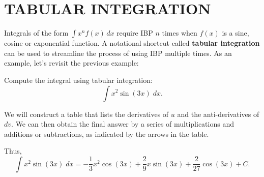 \documentclass{ximera}
\begin{document}
\section{TABULAR INTEGRATION}

Integrals of the form $\int x^n f(x) \,dx$ require IBP $n$ times when $f(x)$ is a sine, cosine or exponential function.
A notational shortcut called \textbf{tabular integration} can be used to streamline the process of using IBP multiple times.
As an example, let's revisit the previous example:

\begin{example}[example 4]
Compute the integral using tabular integration:
  \[
  \int x^2\sin(3x) \;dx.
  \]

We will construct a table that lists the derivatives of $u$ and the anti-derivatives of $dv$.
We can then obtain the final answer by a series of multiplications and additions or subtractions, as indicated
by the arrows in the table.


\begin{image}[5cm]
\end{image}

Thus,
\[
  \int x^2\sin(3x) \;dx = -\frac13 x^2\cos(3x) + \frac29x\sin(3x) + \frac{2}{27} \cos(3x) + C.
  \]

\end{example}
\end{document}
